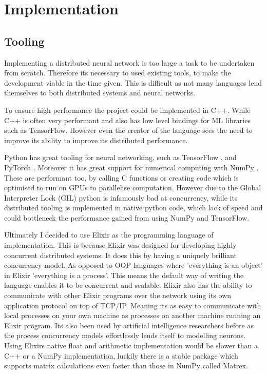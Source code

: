 \clearpage
\section{Implementation}

\subsection{Tooling}
Implementing a distributed neural network is too large a task to be undertaken
from scratch. Therefore its necessary to used existing tools, to make the
development viable in the time given. This is difficult as not many languages
lend themselves to both distributed systems and neural networks.

To ensure high performance the project could be implemented in C++. While C++ is
often very performant and also has low level bindings for ML libraries such as
TensorFlow. However even the creator of the language sees the need to improve
its ability to improve its distributed performance. \cite{stroustrupInterview}

Python has great tooling for neural networking, such as TensorFlow
\cite{abadi2016tensorflow}, and PyTorch \cite{paszke2019pytorch}. Moreover it
has great support for numerical computing with NumPy \cite{harrisNumpy2020}.
These are performant too, by calling C functions or creating code which is
optimised to run on GPUs to parallelise computation. However due to the Global
Interpreter Lock (GIL) python is infamously bad at concurrency, while its
distributed tooling is implemented in native python code, which lack of speed
and could bottleneck the performance gained from using NumPy and TensorFlow.

Ultimately I decided to use Elixir as the programming language of
implementation. This is because Elixir was designed for developing highly
concurrent distributed systems. It does this by having a uniquely brilliant
concurrency model. As opposed to OOP languages where 'everything is an object'
in Elixir 'everything is a process'. This means the default way of writing the
language enables it to be concurrent and scalable. Elixir also has the ability
to communicate with other Elixir programs over the network using its own
application protocol on top of TCP/IP. Meaning its as easy to communicate with
local processes on your own machine as processes on another machine running an
Elixir program. Its also been used by artificial intelligence researchers before
as the process concurrency models effortlessly lends itself to modelling
neurons. \cite{sherNeuroevolutionThroughErlang} Using Elixirs native float and
arithmetic implementation would be slower than a C++ or a NumPy implementation,
luckily there is a stable package which supports matrix calculations even faster
than those in NumPy called Matrex. \cite{matrex}

